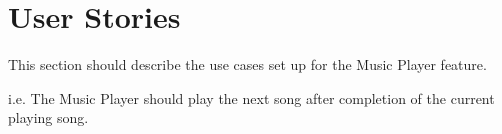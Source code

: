 \section{User Stories}
This section should describe the use cases set up for the Music Player feature.

i.e. The Music Player should play the next song after completion of the current playing song.